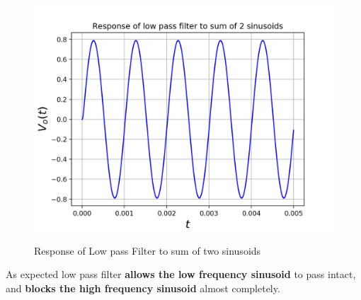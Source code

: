 \documentclass[11pt, a4paper]{article}
\begin{document}
\begin{figure}[H]
   	\centering
   	\includegraphics[scale=0.5]{lpf_2.png}
   	\label{fig:lpf_2}
   	\caption{Response of Low pass Filter to sum of two sinusoids}
\end{figure}
{
As expected low pass filter \textbf{allows the low frequency sinusoid} to pass intact, and \textbf{blocks the high frequency sinusoid} almost completely.
}
\end{document}
